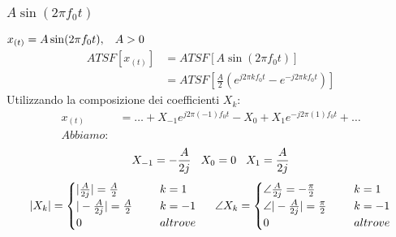             \subsubsection{$A\sin(2\pi f_0 t)$}
                $x_{(t)}=A\sin(2\pi f_0 t), \hspace{0.3cm} A>0$
                \begin{align}
                    ATSF[x_{(t)}] & = ATSF[A\sin(2\pi f_0 t)] \nonumber \\
                        & = ATSF[\frac{A}{2} (e^{j2\pi kf_0t} - e^{-j2\pi kf_0t})] \nonumber 
                \end{align}
                Utilizzando la composizione dei coefficienti $X_k$:
                \begin{align}
                    x_{(t)} & =\ldots  + X_{-1} e^{j2\pi (-1)f_0t} - X_{0} + X_{1} e^{-j2\pi (1) f_0t} + \ldots \nonumber\\
                    Abbiamo:& \nonumber 
                \end{align}
                        \[X_{-1} = -\frac{A}{2j}\hspace{.3cm} X_{0} = 0\hspace{.3cm} X_{1} = \frac{A}{2j}\] 
                \[
                    |X_k|= 
                    \begin{cases}
                            |\frac{A}{2j}| = \frac{A}{2} \hspace{0.5cm} & k= 1\\
                            |-\frac{A}{2j}| = \frac{A}{2} \hspace{0.5cm} & k= -1\\
                            0 \hspace{0.5cm} & altrove  \\
                    \end{cases}
                    \hspace{0.5cm}
                    \angle X_k= 
                    \begin{cases}
                        \angle \frac{A}{2j} = -\frac{\pi}{2} \hspace{0.5cm} & k= 1\\
                        \angle |-\frac{A}{2j}| = \frac{\pi}{2} \hspace{0.5cm} & k= -1\\
                        0 \hspace{0.5cm} & altrove  \\
                    \end{cases}
                    \]
